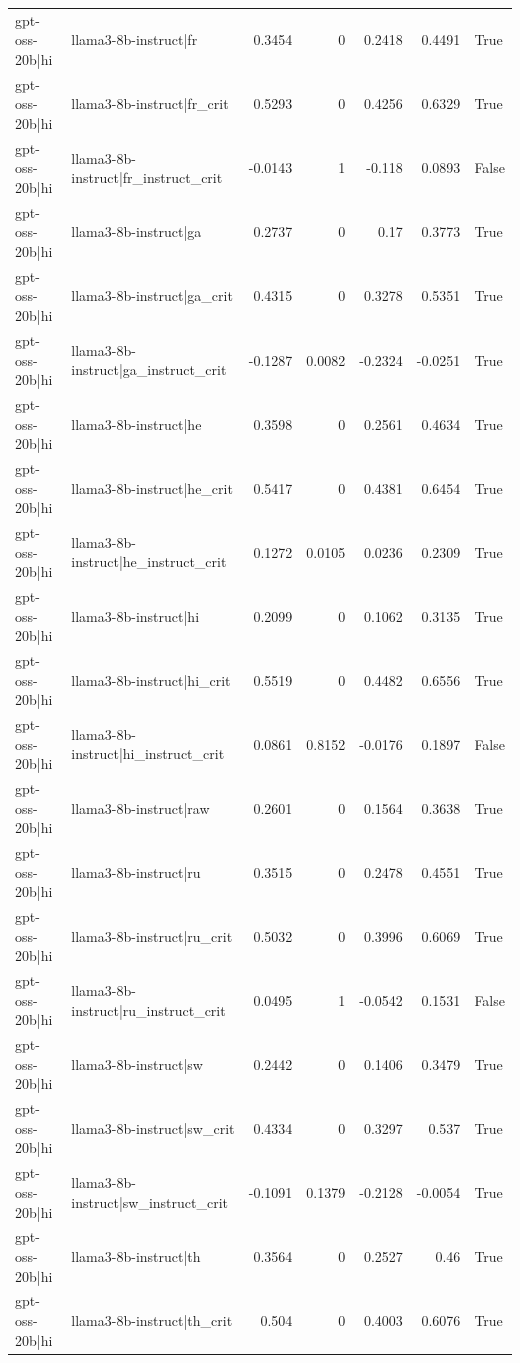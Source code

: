 \begin{table}
\begin{tabular}{l l r r r r l}
gpt-oss-20b|hi & llama3-8b-instruct|fr & 0.3454 & 0 & 0.2418 & 0.4491 & True \\
gpt-oss-20b|hi & llama3-8b-instruct|fr_crit & 0.5293 & 0 & 0.4256 & 0.6329 & True \\
gpt-oss-20b|hi & llama3-8b-instruct|fr_instruct_crit & -0.0143 & 1 & -0.118 & 0.0893 & False \\
gpt-oss-20b|hi & llama3-8b-instruct|ga & 0.2737 & 0 & 0.17 & 0.3773 & True \\
gpt-oss-20b|hi & llama3-8b-instruct|ga_crit & 0.4315 & 0 & 0.3278 & 0.5351 & True \\
gpt-oss-20b|hi & llama3-8b-instruct|ga_instruct_crit & -0.1287 & 0.0082 & -0.2324 & -0.0251 & True \\
gpt-oss-20b|hi & llama3-8b-instruct|he & 0.3598 & 0 & 0.2561 & 0.4634 & True \\
gpt-oss-20b|hi & llama3-8b-instruct|he_crit & 0.5417 & 0 & 0.4381 & 0.6454 & True \\
gpt-oss-20b|hi & llama3-8b-instruct|he_instruct_crit & 0.1272 & 0.0105 & 0.0236 & 0.2309 & True \\
gpt-oss-20b|hi & llama3-8b-instruct|hi & 0.2099 & 0 & 0.1062 & 0.3135 & True \\
gpt-oss-20b|hi & llama3-8b-instruct|hi_crit & 0.5519 & 0 & 0.4482 & 0.6556 & True \\
gpt-oss-20b|hi & llama3-8b-instruct|hi_instruct_crit & 0.0861 & 0.8152 & -0.0176 & 0.1897 & False \\
gpt-oss-20b|hi & llama3-8b-instruct|raw & 0.2601 & 0 & 0.1564 & 0.3638 & True \\
gpt-oss-20b|hi & llama3-8b-instruct|ru & 0.3515 & 0 & 0.2478 & 0.4551 & True \\
gpt-oss-20b|hi & llama3-8b-instruct|ru_crit & 0.5032 & 0 & 0.3996 & 0.6069 & True \\
gpt-oss-20b|hi & llama3-8b-instruct|ru_instruct_crit & 0.0495 & 1 & -0.0542 & 0.1531 & False \\
gpt-oss-20b|hi & llama3-8b-instruct|sw & 0.2442 & 0 & 0.1406 & 0.3479 & True \\
gpt-oss-20b|hi & llama3-8b-instruct|sw_crit & 0.4334 & 0 & 0.3297 & 0.537 & True \\
gpt-oss-20b|hi & llama3-8b-instruct|sw_instruct_crit & -0.1091 & 0.1379 & -0.2128 & -0.0054 & True \\
gpt-oss-20b|hi & llama3-8b-instruct|th & 0.3564 & 0 & 0.2527 & 0.46 & True \\
gpt-oss-20b|hi & llama3-8b-instruct|th_crit & 0.504 & 0 & 0.4003 & 0.6076 & True \\

\end{tabular}
\end{table}
